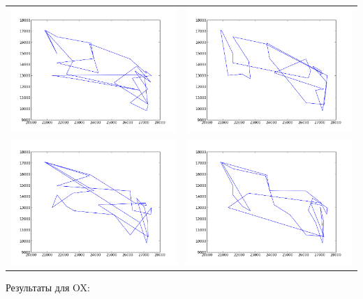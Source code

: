 \documentclass[a4paper]{article}
\begin{document}
\begin{tabular}{cc}
\includegraphics[width=7cm]{1.png} & \includegraphics[width=7cm]{2.png} \\
\includegraphics[width=7cm]{3.png} & \includegraphics[width=7cm]{4.png}
\end{tabular}

\newpage
Результаты для OX:
\end{document}
